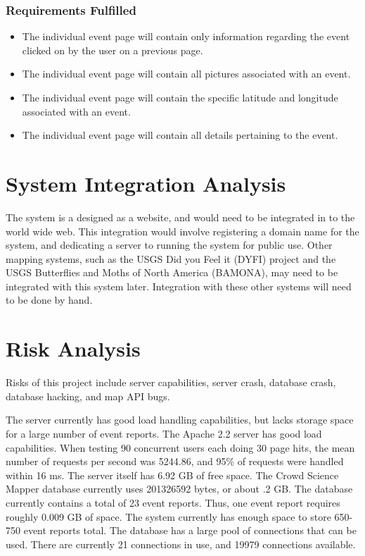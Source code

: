 \subsubsection{Requirements Fulfilled}
\begin{itemize}
\item The individual event page will contain only information regarding the event clicked on by the user on a previous page.
\item The individual event page will contain all pictures associated with an event.
\item The individual event page will contain the specific latitude and longitude associated with an event.
\item The individual event page will contain all details pertaining to the event.
\end{itemize}

\section{System Integration Analysis}
The system is a designed as a website, and would need to be integrated in to the world wide web. This integration would involve registering a domain name for the system, and dedicating a server to running the system for public use. Other mapping systems, such as the USGS Did you Feel it (DYFI) project and the USGS Butterflies and Moths of North America (BAMONA), may need to be integrated with this system later. Integration with these other systems will need to be done by hand.

\section{Risk Analysis}
Risks of this project include server capabilities, server crash, database crash, database hacking, and map API bugs.

The server currently has good load handling capabilities, but lacks storage space for a large number of event reports. The Apache 2.2 server has good load capabilities. When testing 90 concurrent users each doing 30 page hits, the mean number of requests per second was 5244.86, and 95\% of requests were handled within 16 ms. The server itself has 6.92 GB of free space. The Crowd Science Mapper database currently uses 201326592 bytes, or about .2 GB. The database currently contains a total of 23 event reports. Thus, one event report requires roughly 0.009 GB of space. The system currently has enough space to store 650-750 event reports total. The database has a large pool of connections that can be used. There are currently 21 connections in use, and 19979 connections available. 

